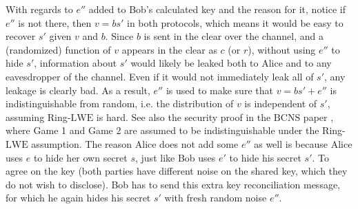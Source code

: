 With regards to $e''$ added to Bob's calculated key and the reason for it, notice if $e''$ is not there, then $v=bs'$ in both protocols, which means it would be easy to recover $s'$ given $v$ and $b$. Since $b$ is sent in the clear over the channel, and a (randomized) function of $v$ appears in the clear as $c$ (or $r$), without using $e''$ to hide $s'$, information about $s'$ would likely be leaked both to Alice and to any eavesdropper of the channel. Even if it would not immediately leak all of $s'$, any leakage is clearly bad. As a result, $e''$ is used to make sure that $v = bs' + e''$ is indistinguishable from random, i.e. the distribution of $v$ is independent of $s'$, assuming Ring-$\mathrm{LWE}$ is hard. See also the security proof in the $\mathrm{BCNS}$ paper \cite{bos2015post}, where Game 1 and Game 2 are assumed to be indistinguishable under the Ring-$\mathrm{LWE}$ assumption. The reason Alice does not add some $e''$ as well is because Alice uses $e$ to hide her own secret $s$, just like Bob uses $e'$ to hide his secret $s'$. To agree on the key (both parties have different noise on the shared key, which they do not wish to disclose). Bob has to send this extra key reconciliation message, for which he again hides his secret $s'$ with fresh random noise $e''$.

